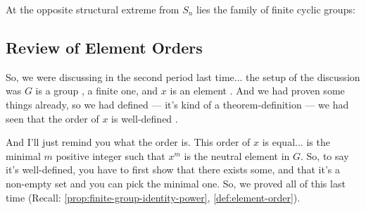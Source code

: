 \begin{content}
At the opposite structural extreme from $S_n$ lies the family of finite cyclic groups:

\end{content}

\subsection{Review of Element Orders}

\begin{speech}[00:02:04 - 00:03:20]
So, we were discussing in the second period last time... the setup of the discussion was $G$ is a group , a finite one, and $x$ is an element . And we had proven some things already, so we had defined --- it's kind of a theorem-definition --- we had seen  that the order of $x$ is well-defined .

And I'll just remind you what the order is. This order of $x$  is equal... is the minimal $m$ positive integer such that  $x^m$ is the neutral element in $G$. So, to say it's well-defined, you have to first show that there exists some, and that it's a non-empty set and you can pick the minimal one. So, we proved all of this last time (Recall: \cref{prop:finite-group-identity-power}, \cref{def:element-order}).
\end{speech}

